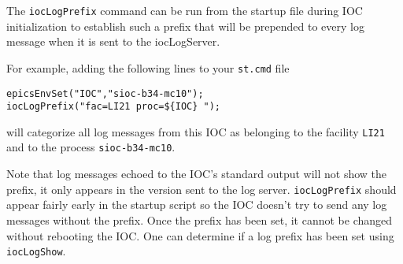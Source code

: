 The \verb|iocLogPrefix| command can be run from the startup file during IOC initialization to establish such a prefix that will be prepended to every log message when it is sent to the iocLogServer.

For example, adding the following lines to your \verb|st.cmd| file 

\begin{verbatim}
epicsEnvSet("IOC","sioc-b34-mc10");
iocLogPrefix("fac=LI21 proc=${IOC} ");
\end{verbatim}

will categorize all log messages from this IOC as belonging to the facility \verb|LI21| and to the process \verb|sioc-b34-mc10|.

Note that log messages echoed to the IOC's standard output will not show the prefix, it only appears in the version sent to the log server.
\verb|iocLogPrefix| should appear fairly early in the startup script so the IOC doesn't try to send any log messages without the prefix.
Once the prefix has been set, it cannot be changed without rebooting the IOC.
One can determine if a log prefix has been set using \verb|iocLogShow|.
